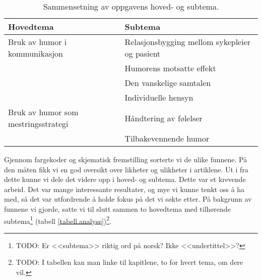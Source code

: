 \begin{table}
  \centering
  \small
  \begin{tabular}{@{}ll@{}}
    \toprule
    \textbf{Hovedtema} & \textbf{Subtema} \\
    \midrule
    Bruk av humor i kommunikasjon
      & Relasjonsbygging mellom sykepleier og pasient \\
      & Humorens motsatte effekt \\
      & Den vanskelige samtalen \\
      & Individuelle hensyn \\
    \midrule
    Bruk av humor som mestringsstrategi
      & Håndtering av følelser \\
      & Tilbakevennende humor \\
    \bottomrule
  \end{tabular}
  \label{tabell.analyse}
  \caption{Sammensetning av oppgavens hoved- og subtema.}
\end{table}

Gjennom fargekoder og skjematisk fremstilling sorterte vi de ulike funnene. På
den måten fikk vi en god oversikt over likheter og ulikheter i artiklene. Ut i
fra dette kunne vi dele det videre opp i hoved- og subtema. Dette var et
krevende arbeid. Det var mange interessante resultater, og mye vi kunne tenkt
oss å ha med, så det var utfordrende å holde fokus på det vi søkte etter. På
bakgrunn av funnene vi gjorde, satte vi til slutt sammen to hovedtema med
tilhørende subtema\footnote{TODO: Er <<subtema>> riktig ord på norsk? Ikke
<<undertittel>>?} (tabell \vref{tabell.analyse})\footnote{TODO: I tabellen kan
man linke til kapitlene, to for hvert tema, om dere vil.}.
